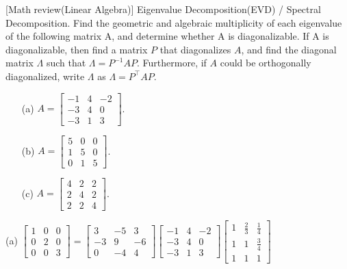 \item {} [Math review(Linear Algebra)] Eigenvalue Decomposition(EVD) / Spectral Decomposition.
Find the geometric and algebraic multiplicity of each eigenvalue of the following matrix A, and determine whether A is diagonalizable. If A is diagonalizable, then find a matrix $P$ that diagonalizes $A$, and find the diagonal matrix $\Lambda$ such that $\Lambda = P^{-1}AP$. Furthermore, if $A$ could be orthogonally diagonalized, write $\Lambda$ as $\Lambda = P^{\top}AP$.

\begin{itemize}
    \item[(a)] $A=\begin{bmatrix} -1 & 4 & -2 \\ -3 & 4 & 0 \\ -3 & 1 & 3 \end{bmatrix}$. ~
    \item[(b)] $A=\begin{bmatrix} 5 & 0 & 0 \\ 1 & 5 & 0 \\ 0 & 1 & 5 \end{bmatrix}$. ~
    \item[(c)] $A=\begin{bmatrix} 4 & 2 & 2 \\ 2 & 4 & 2 \\ 2 & 2 & 4 \end{bmatrix}$. ~
\end{itemize}

\solution

(a) $\begin{bmatrix}1 & 0 & 0 \\ 0 & 2 & 0 \\ 0 & 0 & 3 \end{bmatrix} = \begin{bmatrix}3 & -5 & 3 \\ -3 & 9 & -6 \\ 0 & -4 & 4 \end{bmatrix} \begin{bmatrix} -1 & 4 & -2 \\ -3 & 4 & 0 \\ -3 & 1 & 3 \end{bmatrix} \begin{bmatrix} 1 & \frac{2}{3} & \frac{1}{4} \\ 1 & 1 & \frac{3}{4} \\ 1 & 1 & 1 \end{bmatrix}$

